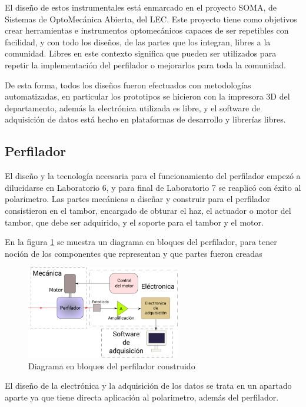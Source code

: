 
El diseño de estos instrumentales está enmarcado en el proyecto SOMA\cite{soma}, de Sistemas de OptoMecánica Abierta, del LEC. Este proyecto tiene como objetivos crear herramientas e instrumentos optomecánicos capaces de ser repetibles con facilidad, y con todo los diseños, de las partes que los integran, libres a la comunidad. Libres en este contexto significa que pueden ser utilizados para repetir la implementación del perfilador o mejorarlos para toda la comunidad.

De esta forma, todos los diseños fueron efectuados con metodologías automatizadas, en particular los prototipos se hicieron con la impresora 3D del departamento, además la electrónica utilizada es libre, y el software de adquisición de datos está hecho en plataformas de desarrollo y librerías libres.

\subsection{Perfilador}

El diseño y la tecnología necesaria para el funcionamiento del perfilador empezó a dilucidarse en Laboratorio 6, y para final de Laboratorio 7 se reaplicó con éxito al polarimetro. Las partes mecánicas a diseñar y construir para el perfilador consistieron en el tambor, encargado de obturar el haz, el actuador o motor del tambor, que debe ser adquirido, y el soporte para el tambor y el motor. 

En la figura \ref{fig:perfilador/esquema_bloques} se muestra un diagrama en bloques del perfilador, para tener noción de los componentes que representan y que partes fueron creadas

\begin{figure}[H]
    \centering
    \includegraphics[width=0.6\textwidth]{fig/perfilador/esquema_bloques}
    \caption{Diagrama en bloques del perfilador construido}
    \label{fig:perfilador/esquema_bloques}
\end{figure}

El diseño de la electrónica y la adquisición de los datos se trata en un apartado aparte ya que tiene directa aplicación al polarimetro, además del perfilador.

